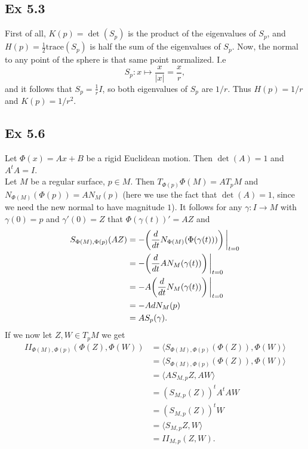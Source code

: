 \documentclass{article}
\newcommand\restr[2]{{%
  \left.\kern-\nulldelimiterspace %
  #1 %
  \vphantom{\big|} %
  \right|_{#2} %
  }}
\theoremstyle{definition}
\begin{document}
\subsection*{Ex 5.3}

First of all, $K(p) = \det(S_p)$ is the product of the eigenvalues of $S_p$,
and $H(p) = \frac{1}{2} \text{trace}(S_p)$ is half the sum of the eigenvalues
of $S_p$. Now, the normal to any point of the sphere is that same point
normalized. I.e
\[
	S_p : x \mapsto \frac{x}{|x|} = \frac{x}{r},
\]
and it follows that $S_p = \frac{1}{r} I$, so both eigenvalues of $S_p$ are
$1/r$. Thus $H(p) = 1/r$ and $K(p) = 1/r^2$.

\subsection*{Ex 5.6}

Let $\Phi(x) = Ax + B$ be a rigid Euclidean motion. Then $\det(A) = 1$ and $A^t
A = I$. \\

Let $M$ be a regular surface, $p \in M$. Then $T_{\Phi(p)}\Phi(M) = AT_{p}M$
and $N_{\Phi(M)}(\Phi(p)) = A N_{M}(p)$ (here we use the fact that $\det(A) =
1$, since we need the new normal to have magnitude $1$). It follows for any
$\gamma : I \to M$ with $\gamma(0) = p$ and $\gamma'(0) = Z$ that
$\Phi(\gamma(t))' = AZ$ and
\begin{align*}
	S_{\Phi(M), \Phi(p)}(AZ)
	&=
	-\restr{\left(\frac{d}{dt}N_{\Phi(M)}(\Phi(\gamma(t)))\right)}{t = 0} \\
	&=
	-\restr{\left(\frac{d}{dt}AN_{M}(\gamma(t))\right)}{t = 0} \\
	&=
	-A\restr{\left(\frac{d}{dt}N_{M}(\gamma(t))\right)}{t = 0} \\
	&=
	-A dN_M(p) \\
	&=
	A S_p(\gamma).
\end{align*} 
If we now let $Z, W \in T_p M$ we get
\begin{align*}
	II_{\Phi(M), \Phi(p)}(\Phi(Z), \Phi(W))
	&=
	\langle S_{\Phi(M), \Phi(p)}(\Phi(Z)), \Phi(W)\rangle \\
	&=
	\langle S_{\Phi(M), \Phi(p)}(\Phi(Z)), \Phi(W)\rangle \\
	&=
	\langle AS_{M, p}Z, AW \rangle \\
	&=
	(S_{M, p}(Z))^t A^t A W \\
	&=
	(S_{M, p}(Z))^t W \\
	&=
	\langle S_{M, p}Z, W \rangle \\
	&=
	II_{M, p}(Z, W).
\end{align*}
\end{document}
